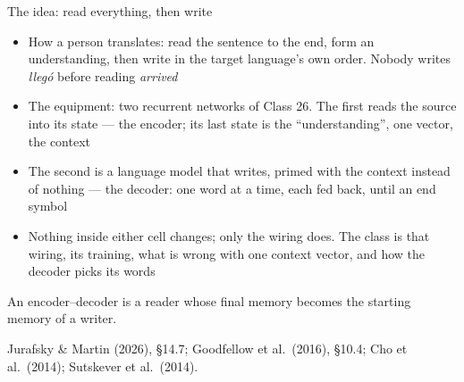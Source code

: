 \documentclass[aspectratio=169, 11pt]{beamer}
\newcommand{\srcline}[1]{%
  \par\vspace{0.25em}%
  {\scriptsize\color{mcMuted}\hfill #1\par}}
\newcommand{\src}[3]{}      %
\begin{document}
\begin{frame}{The idea: read everything, then write}
  \src{jurafsky_slp3}{section}{14.7}
  \src{goodfellow2016}{section}{10.4}
  \src{cho2014}{section}{2.2}
  \src{sutskever2014}{section}{2}
  \vspace{0.05em}
  {\footnotesize
  \begin{itemize}\itemsep0.28em
    \item How a person translates: read the sentence \alert{to the end},
          form an understanding, then write in the target language's own
          order. Nobody writes \emph{lleg\'o} before reading \emph{arrived}
    \item The equipment: \alert{two} recurrent networks of Class 26. The
          first \alert{reads} the source into its state --- the
          \alert{encoder}; its last state is the ``understanding'', one
          vector, the \alert{context}
    \item The second is a language model that \alert{writes}, primed with
          the context instead of nothing --- the \alert{decoder}: one word
          at a time, each fed back, until an end symbol
    \item Nothing inside either cell changes; only the wiring does. The
          class is that wiring, its training, what is wrong with one
          context vector, and how the decoder picks its words
  \end{itemize}}
  \vspace{0.1em}
  \begin{redhighlight}
    An encoder--decoder is a reader whose final memory becomes the
    starting memory of a writer.
  \end{redhighlight}
  \srcline{Jurafsky \& Martin (2026), \S14.7; Goodfellow et al.\ (2016), \S10.4; Cho et al.\ (2014); Sutskever et al.\ (2014).}
\end{frame}
\end{document}
